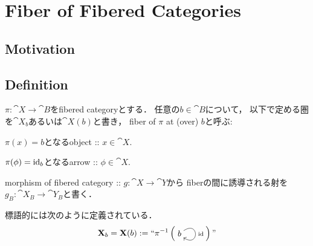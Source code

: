 \documentclass[a4paper, dvipdfmx]{jsarticle}
\begin{document}
\section{Fiber of Fibered Categories}
\subsection{Motivation}

\subsection{Definition}
\begin{Def}[Fiber]
    $\pi \colon \cat{X} \to \cat{B}$をfibered categoryとする．
    任意の$b \in \cat{B}$について，
    以下で定める圏を$\cat{X}_b$あるいは$\cat{X}(b)$と書き，
    fiber of $\pi$ at (over) $b$と呼ぶ:
    \begin{description}[labelindent=1cm]
        \item[Object.] $\pi(x)=b$となるobject :: $x \in \cat{X}$.
        \item[Arrow.] $\pi(\phi)=\id[b]$となるarrow :: $\phi \in \cat{X}$.
    \end{description}

    morphism of fibered category :: $g \colon \cat{X} \to \cat{Y}$から
    fiberの間に誘導される射を$g_B \colon \cat{X}_B \to \cat{Y}_B$と書く．
\end{Def}
\begin{Remark}
    標語的には次のように定義されている．
    \[
        \cat{X}_b=\cat{X}(b):=``
        \pi^{-1} \left(
        \vcenter{\xymatrix{
            b \ar@(ur,dr)^-{\id}
        }}
        \right)"
    \]
\end{Remark}
\end{document}
